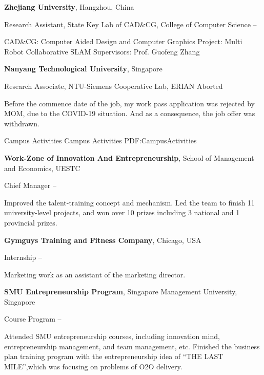 \documentclass[letterpaper,MMMyyyy,nonstopmode]{simpleresumecv}
\begin{document}
\begin{Body}
\Gap
\Entry
{\textbf{Zhejiang University}},
Hangzhou, China

\BulletItem
Research Assistant,
State Key Lab of CAD\&CG,
College of Computer Science
\hfill
{} --
\begin{Detail}
	\SubBulletItem
	CAD\&CG: Computer Aided Design and Computer Graphics
	\SubBulletItem
	Project: Multi Robot Collaborative SLAM
	\SubBulletItem
	Supervisors:
	Prof. Guofeng Zhang
\end{Detail}

\Gap
\Entry
{\textbf{Nanyang Technological University}},
Singapore

\BulletItem
Research Associate,
NTU-Siemens Cooperative Lab, ERIAN
\hfill
Aborted
\begin{Detail}
	\SubBulletItem
	Before the commence date of the job, my work pass application was rejected by MOM, due to the COVID-19 situation. And as a consequence, the job offer was withdrawn.
\end{Detail}


\Section
{Campus Activities}
{Campus Activities}
{PDF:CampusActivities}

\Entry
{\textbf{Work-Zone of Innovation And Entrepreneurship}},
School of Management and Economics, 
UESTC

\BulletItem
Chief Manager
\hfill
{} --
\begin{Detail}
\SubBulletItem
Improved the talent-training concept and mechanism.
\SubBulletItem
Led the team to finish 11 university-level projects, and won over 10 prizes including 3 national
 and 1 provincial prizes.
\end{Detail}

\Gap
{\textbf{Gymguys Training and Fitness Company}},
Chicago, 
USA

\BulletItem
Internship
\hfill
{} --
\begin{Detail}
	\SubBulletItem
	Marketing work as an assistant of the marketing director.
\end{Detail}

\Gap
{\textbf{SMU Entrepreneurship Program}},
Singapore Management University,
Singapore

\BulletItem
Course Program
\hfill
{} --
\begin{Detail}
\SubBulletItem
Attended SMU entrepreneurship courses, including innovation mind, entrepreneurship management, and team management, etc.
\SubBulletItem
Finished the business plan training program with the entrepreneurship idea of “THE LAST MILE”,which was focusing on problems of O2O delivery.
\end{Detail}



\end{Body}
\end{document}
